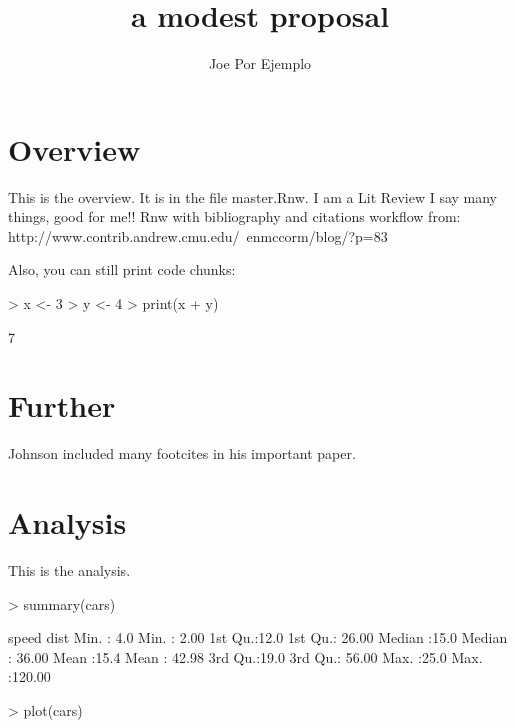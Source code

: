 \documentclass{article}
\author{Joe Por Ejemplo}
\title{a modest proposal}
\begin{document}

\maketitle

\section{Overview}
This is the overview. It is in the file master.Rnw.  I am a Lit Review I say many things, good for me!!
Rnw with bibliography and citations workflow from: http://www.contrib.andrew.cmu.edu/~enmccorm/blog/?p=83

Also, you can still print code chunks:
\begin{Schunk}
\begin{Sinput}
> x <- 3
> y <- 4
> print(x + y)
\end{Sinput}
\begin{Soutput}
[1] 7
\end{Soutput}
\end{Schunk}

\section{Further}  Johnson included many footcites in his important paper.\cite{Lin++2008}


\section{Analysis}
This is the analysis.

\begin{Schunk}
\begin{Sinput}
> summary(cars)
\end{Sinput}
\begin{Soutput}
     speed           dist       
 Min.   : 4.0   Min.   :  2.00  
 1st Qu.:12.0   1st Qu.: 26.00  
 Median :15.0   Median : 36.00  
 Mean   :15.4   Mean   : 42.98  
 3rd Qu.:19.0   3rd Qu.: 56.00  
 Max.   :25.0   Max.   :120.00  
\end{Soutput}
\begin{Sinput}
> plot(cars)
\end{Sinput}
\end{Schunk}
\nocite{*}


\end{document}
